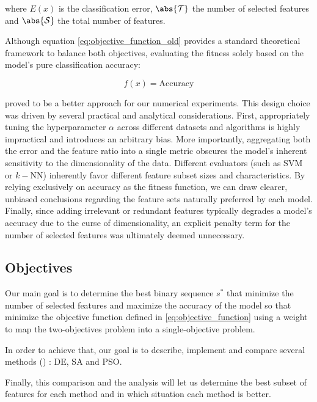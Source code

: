 \documentclass[12pt, openany]{article}
\begin{document}
where $E(x)$ is the classification error, $\abs{\mathcal{T}}$ the number of selected features and $\abs{\mathcal{S}}$ the total number of features.

Although equation \eqref{eq:objective_function_old} provides a standard theoretical framework to balance both objectives, evaluating the fitness solely based on the model's pure classification accuracy:

\begin{equation}\label{eq:objective_function}
    f(x) = \text{Accuracy}
\end{equation}

proved to be a better approach for our numerical experiments. This design choice was driven by several practical and analytical considerations. First, appropriately tuning the hyperparameter $\alpha$ across different datasets and algorithms is highly impractical and introduces an arbitrary bias. More importantly, aggregating both the error and the feature ratio into a single metric obscures the model's inherent sensitivity to the dimensionality of the data. Different evaluators (such as SVM or $k-$NN) inherently favor different feature subset sizes and characteristics. By relying exclusively on accuracy as the fitness function, we can draw clearer, unbiased conclusions regarding the feature sets naturally preferred by each model. Finally, since adding irrelevant or redundant features typically degrades a model's accuracy due to the curse of dimensionality, an explicit penalty term for the number of selected features was ultimately deemed unnecessary.

\subsection{Objectives}\label{sec:objectives}

Our main goal is to determine the best binary sequence $s^*$ that minimize the number of selected features and maximize the accuracy of the model so that minimize the objective function defined in \eqref{eq:objective_function} using a weight to map the two-objectives problem into a single-objective problem.

In order to achieve that, our goal is to describe, implement and compare several methods () : DE, SA and PSO.

Finally, this comparison and the analysis will let us determine the best subset of features for each method and in which situation each method is better.
\end{document}

